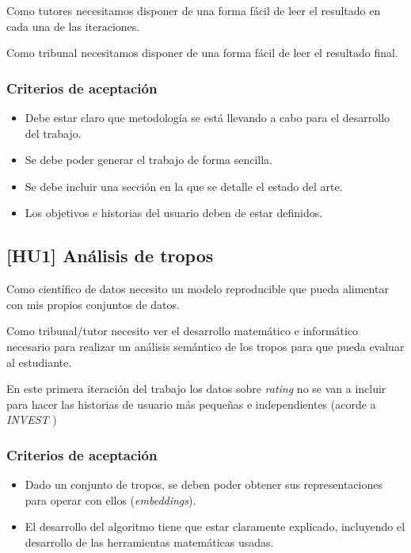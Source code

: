 Como tutores necesitamos disponer de una forma fácil de leer el resultado en cada
una de las iteraciones.

Como tribunal necesitamos disponer de una forma fácil de leer el resultado final.

\subsubsection{Criterios de aceptación}

\begin{itemize}
      \item Debe estar claro que metodología se está llevando a cabo para el desarrollo del trabajo.
      \item Se debe poder generar el trabajo de forma sencilla.
      \item Se debe incluir una sección en la que se detalle el estado del arte.
      \item Los objetivos e historias del usuario deben de estar definidos.
\end{itemize}

\subsection{[HU1] Análisis de tropos}

Como científico de datos necesito un modelo reproducible que pueda alimentar con mis propios
conjuntos de datos.

Como tribunal/tutor necesito ver el desarrollo matemático e informático necesario para realizar
un análisis semántico de los tropos para que pueda evaluar al estudiante.

En este primera iteración del trabajo los datos sobre \textit{rating} no se van a incluir para
hacer las historias de usuario más pequeñas e independientes (acorde a \textit{INVEST} \cite{buglione2013improving})

\subsubsection{Criterios de aceptación}

\begin{itemize}
      \item Dado un conjunto de tropos, se deben poder obtener sus representaciones para operar con ellos  (\textit{embeddings}).
      \item El desarrollo del algoritmo tiene que estar claramente explicado, incluyendo el desarrollo de las herramientas matemáticas usadas.
\end{itemize}


